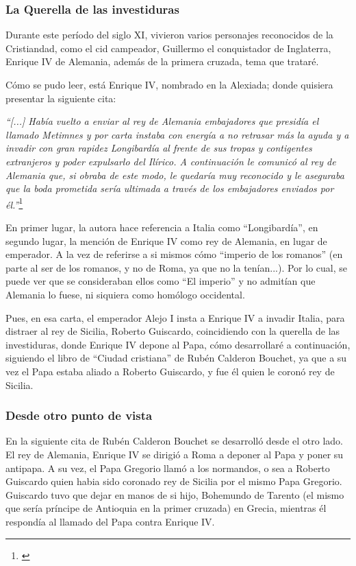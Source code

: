 

\subsubsection{La Querella de las investiduras}

Durante este período del siglo XI, vivieron varios personajes
reconocidos de la Cristiandad, como el cid campeador, Guillermo
el conquistador de Inglaterra, Enrique IV de Alemania, además
de la primera cruzada, tema que trataré.

Cómo se pudo leer, está Enrique IV, nombrado en la Alexiada;
donde quisiera presentar la siguiente cita:

\textit{``[...] Había vuelto a enviar al rey de Alemania embajadores
que presidía el llamado Metimnes y por carta instaba con energía a no
retrasar más la ayuda y a invadir con gran rapidez Longibardía al frente
de sus tropas y contigentes extranjeros y poder expulsarlo del Ilírico.
A continuación le comunicó al rey de Alemania que, si obraba de este
modo, le quedaría muy reconocido y le aseguraba que la boda prometida
sería ultimada a través de los embajadores enviados por él.''}\footnote{\cite[p.~215]{alexiadaV}}

En primer lugar, la autora hace referencia a Italia como ``Longibardía'',
en segundo lugar, la mención de Enrique IV como rey de Alemania, en
lugar de emperador. A la vez de referirse a si mismos cómo
``imperio de los romanos'' (en parte al ser de los romanos, y no
de Roma, ya que no la tenían...). Por lo cual, se puede ver
que se consideraban ellos como ``El imperio'' y no admitían que
Alemania lo fuese, ni siquiera como homólogo occidental.

Pues, en esa carta, el emperador Alejo I insta a Enrique IV a invadir
Italia, para distraer al rey de Sicilia, Roberto Guiscardo,
coincidiendo con la querella de las investiduras, donde Enrique IV
depone al Papa, cómo desarrollaré a continuación, siguiendo el libro de
``Ciudad cristiana'' de Rubén Calderon Bouchet, ya que a su vez
el Papa estaba aliado a Roberto Guiscardo, y fue él quien le coronó
rey de Sicilia.

\subsubsection{Desde otro punto de vista}


En la siguiente cita de Rubén Calderon Bouchet se desarrolló
desde el otro lado. El rey de Alemania, Enrique IV
se dirigió a Roma a deponer al Papa y poner su antipapa.
A su vez, el Papa Gregorio llamó a los normandos,
o sea a Roberto Guiscardo quien habia sido coronado rey de Sicilia
por el mismo Papa Gregorio.
Guiscardo tuvo que dejar en manos de si hijo, Bohemundo de Tarento
(el mismo que sería príncipe de Antioquia en la primer cruzada)
en Grecia, mientras él respondía al llamado del Papa
contra Enrique IV.

